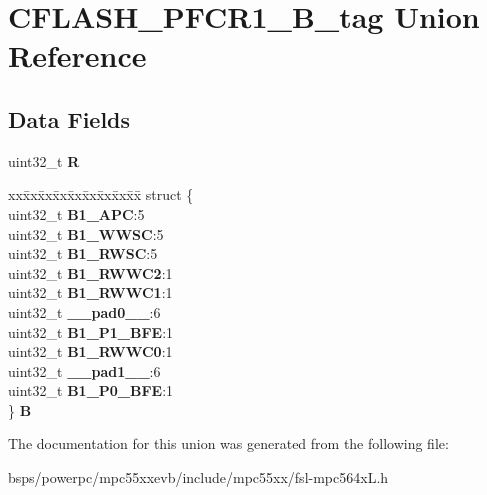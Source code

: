 \hypertarget{unionCFLASH__PFCR1__32B__tag}{}\section{C\+F\+L\+A\+S\+H\+\_\+\+P\+F\+C\+R1\+\_\+B\+\_\+tag Union Reference}
\label{unionCFLASH__PFCR1__32B__tag}
\subsection*{Data Fields}
\begin{DoxyCompactItemize}
\item 
\mbox{\label{unionCFLASH__PFCR1__32B__tag_ae4d0794e614afb5aac75cfeb9249ea9d}} 
uint32\+\_\+t {\bfseries R}
\item 
\mbox{\label{unionCFLASH__PFCR1__32B__tag_aafe3182d9315bff69541258870772b3c}} 
\begin{tabbing}
xx\=xx\=xx\=xx\=xx\=xx\=xx\=xx\=xx\=\kill
struct \{\\
\>uint32\_t {\bfseries B1\_APC}:5\\
\>uint32\_t {\bfseries B1\_WWSC}:5\\
\>uint32\_t {\bfseries B1\_RWSC}:5\\
\>uint32\_t {\bfseries B1\_RWWC2}:1\\
\>uint32\_t {\bfseries B1\_RWWC1}:1\\
\>uint32\_t {\bfseries \_\_pad0\_\_}:6\\
\>uint32\_t {\bfseries B1\_P1\_BFE}:1\\
\>uint32\_t {\bfseries B1\_RWWC0}:1\\
\>uint32\_t {\bfseries \_\_pad1\_\_}:6\\
\>uint32\_t {\bfseries B1\_P0\_BFE}:1\\
\} {\bfseries B}\\

\end{tabbing}\end{DoxyCompactItemize}


The documentation for this union was generated from the following file\+:\begin{DoxyCompactItemize}
\item 
bsps/powerpc/mpc55xxevb/include/mpc55xx/fsl-\/mpc564x\+L.\+h\end{DoxyCompactItemize}
